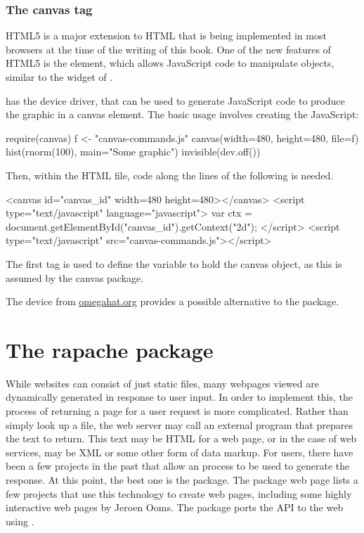 \subsubsection{The canvas tag}
\label{sec:canvas-tag}
HTML5 is a major extension to HTML that is being implemented in most
browsers at the time of the writing of this book. One of the new
features of HTML5 is the  element, which allows
JavaScript code to manipulate objects, similar to the 
widget of . 

\R\/ has the  device driver, that can be used to generate
JavaScript code to produce the graphic in a canvas element. The basic
usage involves creating the JavaScript:
\begin{Schunk}
\begin{Sinput}
 require(canvas)
 f <- "canvas-commands.js"
 canvas(width=480, height=480, file=f)
 hist(rnorm(100), main="Some graphic")
 invisible(dev.off())
\end{Sinput}
\end{Schunk}

Then, within the HTML file, code along the lines of the following is
needed. 
\begin{HTMLinput}
<canvas id="canvas_id" width=480 height=480></canvas>
<script type="text/javascript" language="javascript">
var ctx = document.getElementById("canvas_id").getContext("2d");
</script> 
<script type="text/javascript" src="canvas-commands.js"></script>
\end{HTMLinput}
The first  tag is used to define the variable
 to hold the canvas object, as this is assumed by the canvas
package.

The  device from \url{omegahat.org} provides a
possible alternative to the  package.


\section{The rapache package}
\label{sec:calling-an-r}
While websites can consist of just static files, many webpages viewed
are dynamically generated in response to user input. In order to
implement this, the process of returning a page for a user request is
more complicated. Rather than simply look up a file, the web server
may call an external program that prepares the text to return. This
text may be HTML for a web page, or in the case of web services, may
be XML or some other form of data markup. For \R\/ users, there have
been a few projects in the past that allow an \R\/ process to be used
to generate the response. At this point, the best one is the
 package. The package web page lists a few projects that
use this technology to create web pages, including some highly
interactive web pages by Jeroen Ooms. The  package ports the
 API to the web using .


